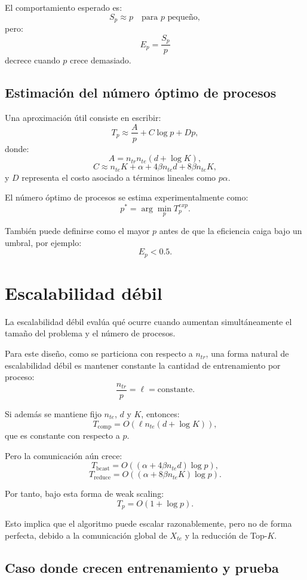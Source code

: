 \documentclass[11pt,a4paper]{article}
\begin{document}
El comportamiento esperado es:
\[
S_p \approx p
\quad \text{para } p \text{ pequeño},
\]
pero:
\[
E_p = \frac{S_p}{p}
\]
decrece cuando $p$ crece demasiado.

\subsection{Estimación del número óptimo de procesos}

Una aproximación útil consiste en escribir:
\[
T_p \approx \frac{A}{p} + C\log p + Dp,
\]
donde:
\[
A = n_{tr}n_{te}(d+\log K),
\]
\[
C \approx n_{te}K + \alpha + 4\beta n_{te}d + 8\beta n_{te}K,
\]
y $D$ representa el costo asociado a términos lineales como $p\alpha$.

El número óptimo de procesos se estima experimentalmente como:
\[
\boxed{
p^* = \arg\min_p T_p^{exp}
}.
\]

También puede definirse como el mayor $p$ antes de que la eficiencia caiga bajo un umbral,
por ejemplo:
\[
E_p < 0.5.
\]

\section{Escalabilidad débil}

La escalabilidad débil evalúa qué ocurre cuando aumentan simultáneamente el tamaño del problema
y el número de procesos.

Para este diseño, como se particiona con respecto a $n_{tr}$, una forma natural de escalabilidad
débil es mantener constante la cantidad de entrenamiento por proceso:
\[
\frac{n_{tr}}{p} = \ell = \text{constante}.
\]

Si además se mantiene fijo $n_{te}$, $d$ y $K$, entonces:
\[
T_{\text{comp}}
=
O(\ell n_{te}(d+\log K)),
\]
que es constante con respecto a $p$.

Pero la comunicación aún crece:
\[
T_{\text{bcast}} =
O((\alpha + 4\beta n_{te}d)\log p),
\]
\[
T_{\text{reduce}} =
O((\alpha + 8\beta n_{te}K)\log p).
\]

Por tanto, bajo esta forma de weak scaling:
\[
T_p
=
O(1 + \log p).
\]

Esto implica que el algoritmo puede escalar razonablemente, pero no de forma perfecta, debido
a la comunicación global de $X_{te}$ y la reducción de Top-$K$.

\subsection{Caso donde crecen entrenamiento y prueba}
\end{document}

